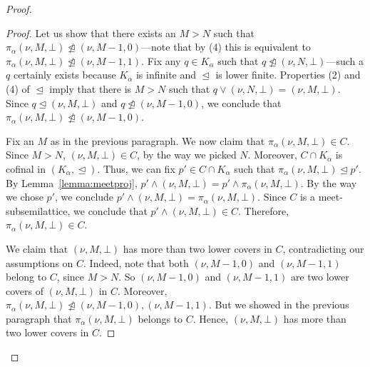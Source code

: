 \documentclass[]{amsart}
\theoremstyle{definition}
\theoremstyle{remark}
\begin{document}
\begin{proof}
\begin{proof}
Let us show that there exists an $M > N$  such that $\pi_{\alpha}(\nu, M, \bot) \ntrianglelefteq (\nu, M-1, 0)$---note that by (4) this is equivalent to $\pi_{\alpha}(\nu, M, \bot) \ntrianglelefteq (\nu, M-1, 1)$. Fix any $q \in K_\alpha$ such that $q \ntrianglelefteq (\nu, N, \bot)$---such a $q$ certainly exists because $K_\alpha$ is infinite and $\trianglelefteq$ is lower finite. Properties (2) and (4) of $\trianglelefteq$ imply that there is $M > N$ such that $q \vee (\nu, N, \bot) = (\nu, M, \bot)$. Since $q \trianglelefteq (\nu, M, \bot)$  and $q \ntrianglelefteq (\nu, M-1, 0)$, we conclude that $\pi_{\alpha}(\nu, M, \bot) \ntrianglelefteq (\nu, M-1, 0)$.

Fix an $M$ as in the previous paragraph. We now claim that $\pi_\alpha (\nu, M, \bot) \in C$. Since $M > N$, $(\nu, M, \bot) \in C$, by the way we picked $N$. Moreover, $C \cap K_\alpha$ is cofinal in $(K_\alpha, \trianglelefteq)$. Thus, we can fix $p' \in C \cap K_\alpha$ such that $\pi_\alpha (\nu, M, \bot) \trianglelefteq p'$. By Lemma~\ref{lemma:meetproj}, $p' \wedge (\nu, M, \bot) = p' \wedge \pi_\alpha (\nu, M, \bot)$. By the way we chose $p'$, we conclude $p' \wedge (\nu, M, \bot) = \pi_\alpha (\nu, M, \bot)$. Since $C$ is a meet-subsemilattice, we conclude that $p' \wedge (\nu, M, \bot) \in C$. Therefore, $\pi_\alpha (\nu, M, \bot) \in C$.

We claim that $(\nu, M, \bot)$ has more than two lower covers in $C$, contradicting our assumptions on $C$. Indeed, note that both $(\nu, M-1, 0)$ and  $(\nu, M-1, 1)$ belong to $C$, since $M > N$. So $(\nu, M-1, 0)$ and $(\nu, M-1, 1)$ are two lower covers of $(\nu, M, \bot)$ in $C$. Moreover, $\pi_\alpha (\nu, M, \bot) \ntrianglelefteq (\nu, M-1, 0),(\nu, M-1, 1)$. But we showed in the previous paragraph that $\pi_\alpha (\nu, M, \bot)$ belongs to $C$. Hence, $(\nu, M, \bot)$ has more than two lower covers in $C$.
\end{proof}



\end{proof}
\end{document}
